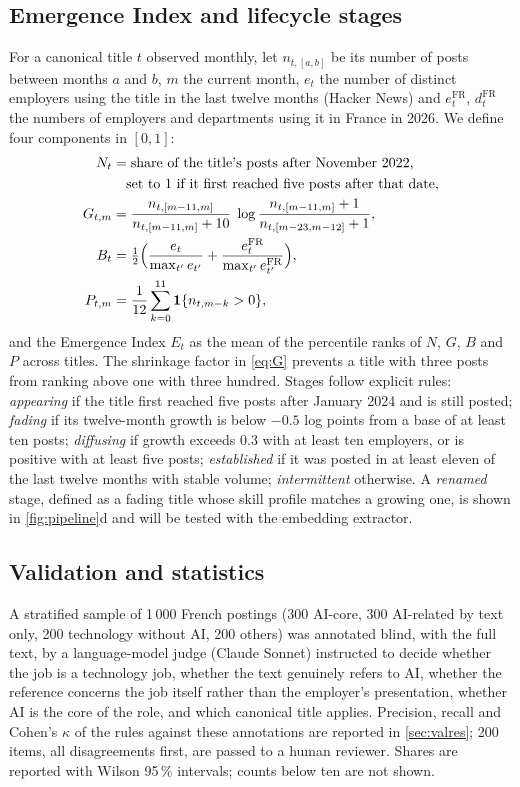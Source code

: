\documentclass[5p,times,twocolumn,authoryear]{elsarticle}
\begin{document}
\subsection{Emergence Index and lifecycle stages}\label{sec:index}
For a canonical title $t$ observed monthly, let $n_{t,[a,b]}$ be its number of posts between months $a$ and $b$, $m$ the current month, $e_{t}$ the number of distinct employers using the title in the last twelve months (Hacker News) and $e^{\mathrm{FR}}_{t}$, $d^{\mathrm{FR}}_{t}$ the numbers of employers and departments using it in France in 2026. We define four components in $[0,1]$:
\begin{align}
N_t &= \text{share of the title's posts after November 2022,}\notag\\
    &\quad\text{set to 1 if it first reached five posts after that date},\\
G_{t,m} &= \frac{n_{t,[m-11,m]}}{n_{t,[m-11,m]}+10}\;\log\frac{n_{t,[m-11,m]}+1}{n_{t,[m-23,m-12]}+1},\label{eq:G}\\
B_t &= \tfrac12\Big(\frac{e_t}{\max_{t'} e_{t'}}+\frac{e^{\mathrm{FR}}_t}{\max_{t'} e^{\mathrm{FR}}_{t'}}\Big),\\
P_{t,m} &= \frac{1}{12}\sum_{k=0}^{11}\mathbf 1\{n_{t,m-k}>0\},
\end{align}
and the Emergence Index $E_t$ as the mean of the percentile ranks of $N$, $G$, $B$ and $P$ across titles. The shrinkage factor in \eqref{eq:G} prevents a title with three posts from ranking above one with three hundred. Stages follow explicit rules: \emph{appearing} if the title first reached five posts after January 2024 and is still posted; \emph{fading} if its twelve-month growth is below $-0.5$ log points from a base of at least ten posts; \emph{diffusing} if growth exceeds $0.3$ with at least ten employers, or is positive with at least five posts; \emph{established} if it was posted in at least eleven of the last twelve months with stable volume; \emph{intermittent} otherwise. A \emph{renamed} stage, defined as a fading title whose skill profile matches a growing one, is shown in \cref{fig:pipeline}d and will be tested with the embedding extractor.


\subsection{Validation and statistics}\label{sec:validation}
A stratified sample of 1\,000 French postings (300 AI-core, 300 AI-related by text only, 200 technology without AI, 200 others) was annotated blind, with the full text, by a language-model judge (Claude Sonnet) instructed to decide whether the job is a technology job, whether the text genuinely refers to AI, whether the reference concerns the job itself rather than the employer's presentation, whether AI is the core of the role, and which canonical title applies. Precision, recall and Cohen's $\kappa$ of the rules against these annotations are reported in \cref{sec:valres}; 200 items, all disagreements first, are passed to a human reviewer. Shares are reported with Wilson 95\,\% intervals; counts below ten are not shown.
\end{document}
